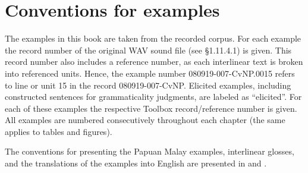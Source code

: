 \chapter[Conventions for examples]{Conventions for examples}\label{Para_0}

The examples in this book are taken from the recorded corpus. For each example the record number of the original WAV sound file (see §1.11.4.1) is given. This record number also includes a reference number, as each interlinear text is broken into referenced units. Hence, the example number 080919-007-CvNP.0015 refers to line or unit 15 in the record 080919-007-CvNP. Elicited examples, including constructed sentences for grammaticality judgments, are labeled as ``elicited''. For each of these examples the respective Toolbox record/reference number is given. All examples are numbered consecutively throughout each chapter (the same applies to tables and figures).

The conventions for presenting the Papuan Malay examples, interlinear gloss\-es, and the translations of the examples into English are presented in  and .

